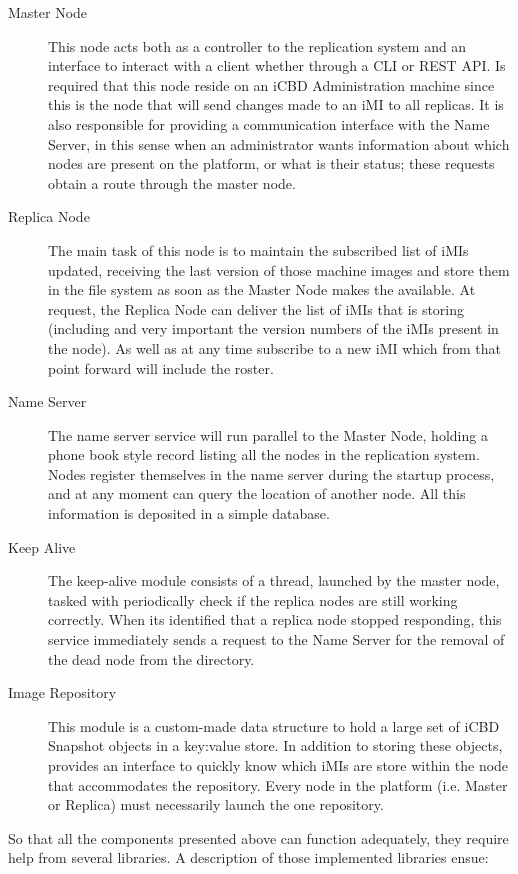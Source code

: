 \begin{description}
	\item [Master Node] This node acts both as a controller to the replication system and an interface to interact with a client whether through a CLI or REST API. Is required that this node reside on an iCBD Administration machine since this is the node that will send changes made to an iMI to all replicas. It is also responsible for providing a communication interface with the Name Server, in this sense when an administrator wants information about which nodes are present on the platform, or what is their status; these requests obtain a route through the master node.
	\item [Replica Node] The main task of this node is to maintain the subscribed list of iMIs updated, receiving the last version of those machine images and store them in the file system as soon as the Master Node makes the available. At request, the Replica Node can deliver the list of iMIs that is storing (including and very important the version numbers of the iMIs present in the node). As well as at any time subscribe to a new iMI which from that point forward will include the roster.
	\item [Name Server] The name server service will run parallel to the Master Node, holding a phone book style record listing all the nodes in the replication system. Nodes register themselves in the name server during the startup process, and at any moment can query the location of another node. All this information is deposited in a simple database.
	\item [Keep Alive] The keep-alive module consists of a thread, launched by the master node, tasked with periodically check if the replica nodes are still working correctly. When its identified that a replica node stopped responding, this service immediately sends a request to the Name Server for the removal of the dead node from the directory.
	\item [Image Repository] This module is a custom-made data structure to hold a large set of iCBD Snapshot objects in a key:value store. In addition to storing these objects, provides an interface to quickly know which iMIs are store within the node that accommodates the repository. Every node in the platform (i.e. Master or Replica) must necessarily launch the one repository.
\end{description}


So that all the components presented above can function adequately, they require help from several libraries. A description of those implemented libraries ensue:

